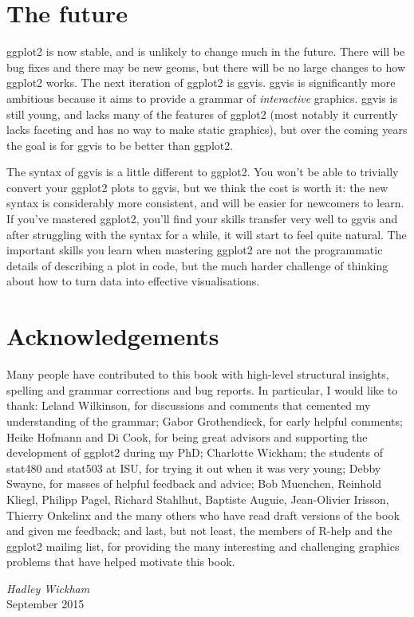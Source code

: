 \section*{The future}

ggplot2 is now stable, and is unlikely to change much in the future.
There will be bug fixes and there may be new geoms, but there will be no
large changes to how ggplot2 works. The next iteration of ggplot2 is
ggvis. ggvis is significantly more ambitious because it aims to provide
a grammar of \emph{interactive} graphics. ggvis is still young, and
lacks many of the features of ggplot2 (most notably it currently lacks
faceting and has no way to make static graphics), but over the coming
years the goal is for ggvis to be better than ggplot2.

The syntax of ggvis is a little different to ggplot2. You won't be able
to trivially convert your ggplot2 plots to ggvis, but we think the cost
is worth it: the new syntax is considerably more consistent, and will be
easier for newcomers to learn. If you've mastered ggplot2, you'll find
your skills transfer very well to ggvis and after struggling with the
syntax for a while, it will start to feel quite natural. The important
skills you learn when mastering ggplot2 are not the programmatic details
of describing a plot in code, but the much harder challenge of thinking
about how to turn data into effective visualisations.

\section*{Acknowledgements}

Many people have contributed to this book with high-level structural
insights, spelling and grammar corrections and bug reports. In
particular, I would like to thank: Leland Wilkinson, for discussions and
comments that cemented my understanding of the grammar; Gabor
Grothendieck, for early helpful comments; Heike Hofmann and Di Cook, for
being great advisors and supporting the development of ggplot2 during my
PhD; Charlotte Wickham; the students of stat480 and stat503 at ISU, for
trying it out when it was very young; Debby Swayne, for masses of
helpful feedback and advice; Bob Muenchen, Reinhold Kliegl, Philipp
Pagel, Richard Stahlhut, Baptiste Auguie, Jean-Olivier Irisson, Thierry
Onkelinx and the many others who have read draft versions of the book
and given me feedback; and last, but not least, the members of R-help
and the ggplot2 mailing list, for providing the many interesting and
challenging graphics problems that have helped motivate this book.

\vspace{\baselineskip}\begin{flushright}\noindent
{\it Hadley Wickham}\\
September 2015\\
\end{flushright}
